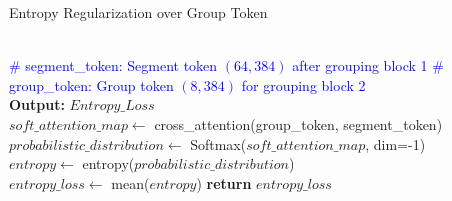 \begin{algorithm}
    \caption{Entropy Regularization over Group Token}
    \label{algo:entropyloss}
    \begin{algorithmic}[1]
            \\
            \State \textcolor{blue}{\# segment\_token: Segment token $(64, 384)$ after grouping block 1}
            \State \textcolor{blue}{\# group\_token: Group token $(8, 384)$ for grouping block 2}
            \\            
            \State \textbf{Output:} $Entropy\_Loss$ 
            \\
            \State $soft\_attention\_map \gets$ cross\_attention(group\_token, segment\_token)
            \\
            \State $probabilistic\_distribution \gets$ 
            Softmax($soft\_attention\_map$, dim=-1)
            \\
            \State $entropy \gets$ 
            entropy($probabilistic\_distribution$)
            \\
            \State $entropy\_loss \gets$ 
            mean($entropy$)
            \State \textbf{return} $entropy\_loss$
        \EndProcedure
    \end{algorithmic}
\end{algorithm}
